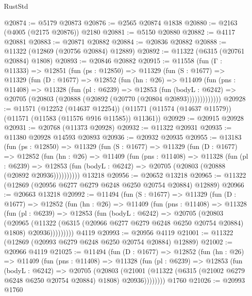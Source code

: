 \begin{lexlean}{RustStd}
\begin{coremodule}
@20874 := @5179 @20873
@20876 := @2565 @20874 @1838
@20880 := @2163 (@4005 (@2175 @20876)) @2180
@20881 := @5150 @20880
@20882 := @4117 @20881
@20883 := @20871 @20882
@20884 := @20836 @20882
@20888 := @11322 (@12869 (@20756 @20884) @12889)
@20892 := @11322 (@6315 (@20761 @20884) @1808)
@20893 := @20846 @20882
@20915 := @11558
    (fun (Γ : @11333) =>
    @12851
      (fun (ps : @12850) =>
      @11329
        (fun (S : @1677) =>
        @11329
          (fun (D : @1677) =>
          @12852
            (fun (hn : @26) =>
            @11409
              (fun (pns : @11408) =>
              @11328
                (fun (pl : @6239) =>
                @12853
                  (fun (bodyL : @6242) =>
                  @20705 (@20803 (@20888 (@20892 (@20770 (@20804 @20893)))))))))))))
@20928 := @11571
    (@12252 (@14637 @12254))
    (@11571 (@11574 (@14637 @11579)) (@11571 (@11583 (@11576 @916 @11585)) @11361))
@20929 := @20915 @20928
@20931 := @20768 (@11373 @20928)
@20932 := @11322 @20931
@20935 := @11380 @20928 @14593 @20893
@20936 := @20932 @20935
@20955 := @13183
    (fun (ps : @12850) =>
    @11329
      (fun (S : @1677) =>
      @11329
        (fun (D : @1677) =>
        @12852
          (fun (hn : @26) =>
          @11409
            (fun (pns : @11408) =>
            @11328
              (fun (pl : @6239) =>
              @12853 (fun (bodyL : @6242) => @20705 (@20803 (@20888 (@20892 @20936))))))))))
    @13218
@20956 := @20652 @13218
@20965 := @11322 (@12869 (@20956 @6277 @6279 @6248 @6250 @20754 @20884) @12889)
@20966 := @20663 @13218
@20992 := @11494
    (fun (S : @1677) =>
    @11329
      (fun (D : @1677) =>
      @12852
        (fun (hn : @26) =>
        @11409
          (fun (pns : @11408) =>
          @11328
            (fun (pl : @6239) =>
            @12853
              (fun (bodyL : @6242) =>
              @20705
                (@20803
                  (@20965
                    (@11322
                      (@6315 (@20966 @6277 @6279 @6248 @6250 @20754 @20884) @1808)
                      @20936)))))))))
    @4119
@20993 := @20956 @4119
@21001 := @11322 (@12869 (@20993 @6279 @6248 @6250 @20754 @20884) @12889)
@21002 := @20966 @4119
@21025 := @11494
    (fun (D : @1677) =>
    @12852
      (fun (hn : @26) =>
      @11409
        (fun (pns : @11408) =>
        @11328
          (fun (pl : @6239) =>
          @12853
            (fun (bodyL : @6242) =>
            @20705
              (@20803
                (@21001
                  (@11322 (@6315 (@21002 @6279 @6248 @6250 @20754 @20884) @1808) @20936))))))))
    @1760
@21026 := @20993 @1760

\end{coremodule}
\end{lexlean}
